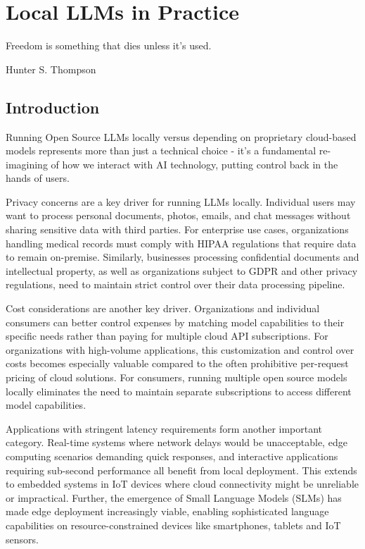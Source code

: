 \setchapterpreamble[u]{\margintoc}
\chapter{Local LLMs in Practice}

\label{chapter:local}

\epigraph{Freedom is something that dies unless it's used.}{Hunter S. Thompson}

\section{Introduction}

Running Open Source LLMs locally versus depending on proprietary cloud-based models represents more than just a technical choice - it's a fundamental re-imagining of how we interact with AI technology, putting control back in the hands of users.

Privacy concerns are a key driver for running LLMs locally. Individual users may want to process personal documents, photos, emails, and chat messages without sharing sensitive data with third parties. For enterprise use cases, organizations handling medical records must comply with HIPAA regulations that require data to remain on-premise. Similarly, businesses processing confidential documents and intellectual property, as well as organizations subject to GDPR and other privacy regulations, need to maintain strict control over their data processing pipeline.

Cost considerations are another key driver. Organizations and individual consumers can better control expenses by matching model capabilities to their specific needs rather than paying for multiple cloud API subscriptions. For organizations with high-volume applications, this customization and control over costs becomes especially valuable compared to the often prohibitive per-request pricing of cloud solutions. For consumers, running multiple open source models locally eliminates the need to maintain separate subscriptions to access different model capabilities.

Applications with stringent latency requirements form another important category. Real-time systems where network delays would be unacceptable, edge computing scenarios demanding quick responses, and interactive applications requiring sub-second performance all benefit from local deployment. This extends to embedded systems in IoT devices where cloud connectivity might be unreliable or impractical. Further, the emergence of Small Language Models (SLMs) has made edge deployment increasingly viable, enabling sophisticated language capabilities on resource-constrained devices like smartphones, tablets and IoT sensors. 

